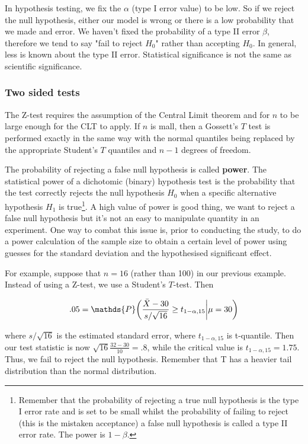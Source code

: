 \documentclass{homework}
\begin{document}
In hypothesis testing, we fix the $\alpha$ (type I error value) to be low. So if we reject the null hypothesis, either our model is wrong or there is a low probability that we made and error. We haven't fixed the probability of a type II error $\beta$, therefore we tend to say "fail to reject $H_0$" rather than accepting $H_0$. In general, less is known about the type II error. Statistical significance is not the same as scientific significance. 

\subsubsection{Two sided tests}

The Z-test requires the assumption of the Central Limit theorem and for $n$ to be large enough for the CLT to apply. If $n$ is mall, then a Gossett's $T$ test is performed exactly in the same way with the normal quantiles being replaced by the appropriate Student's $T$ quantiles and $n-1$ degrees of freedom. 

The probability of rejecting a false null hypothesis is called \textbf{power}. The statistical power of a dichotomic (binary) hypothesis test is the probability that the test correctly rejects the null hypothesis $H_0$ when a specific alternative hypothesis $H_1$ is true\footnote{Remember that the probability of rejecting a true null hypothesis is the type I error rate and is set to be small whilst the probability of failing to reject (this is the mistaken acceptance) a false null hypothesis is called a type II error rate. The power is $1-\beta$.}. A high value of power is good thing, we want to reject a false null hypothesis but it's not an easy to manipulate quantity in an experiment. One way to combat this issue is, prior to conducting the study, to do a power calculation of the sample size to obtain a certain level of power using guesses for the standard deviation and the hypothesised significant effect.

For example, suppose that $n=16$ (rather than 100) in our previous example. Instead of using a Z-test, we use a Student's $T$-test. Then 

$$
.05 = \mathds{P}\bigg(\frac{\Bar{X}-30}{s/\sqrt{16}} \geq t_{1-\alpha, 15} \bigg| \mu = 30\bigg)
$$

where $s/\sqrt{16}$ is the estimated standard error, where $t_{1-\alpha, 15}$ is t-quantile. Then our test statistic is now $\sqrt{16}\frac{32-30}{10} = .8$, while the critical value is $t_{1-\alpha, 15} = 1.75$. Thus, we fail to reject the null hypothesis. Remember that T has a heavier tail distribution than the normal distribution.
\end{document}
